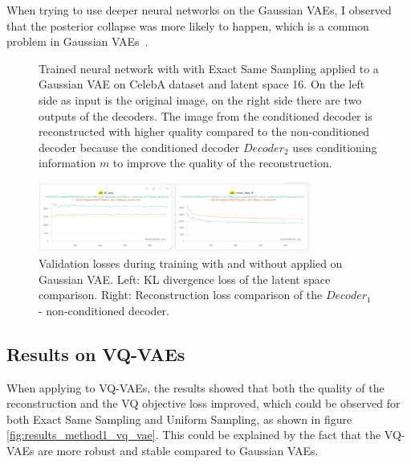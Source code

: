 When trying to use deeper neural networks on the Gaussian VAEs, I observed that the posterior collapse was more likely to happen, which is a common problem in Gaussian VAEs~\cite{wang2023posterior}.

\begin{figure}[H]
    \centering
    
    \caption[Trained neural network with  applied to a Gaussian VAE.]
    { 
        Trained neural network with  with Exact Same Sampling applied to a Gaussian VAE on CelebA dataset and latent space 16. 
        On the left side as input is the original image, on the right side there are two outputs of the decoders. 
        The image from the conditioned decoder is reconstructed with higher quality compared to the non-conditioned decoder because the conditioned decoder $Decoder_2$ uses conditioning information $m$ to improve the quality of the reconstruction.
    }
    \label{fig:res_val}
\end{figure}


\begin{figure}[H]
    \centering
    \includegraphics[width=0.8\textwidth]{figures/results/KL_and_RECON.png}
    \caption[Validation loss during training of a Gaussian VAE.]
    {
        Validation losses during training with and without  applied on Gaussian VAE.
        Left: KL divergence loss of the latent space comparison. Right: Reconstruction loss comparison of the $Decoder_1$ - non-conditioned decoder.
    }
    \label{fig:results_method1_gaussian_vae}
\end{figure}

\subsection{Results on VQ-VAEs}

When applying  to VQ-VAEs, the results showed that both the quality of the reconstruction and the VQ objective loss improved, which could be observed for both Exact Same Sampling and Uniform Sampling, as shown in figure \ref{fig:results_method1_vq_vae}. This could be explained by the fact that the VQ-VAEs are more robust and stable compared to Gaussian VAEs.

